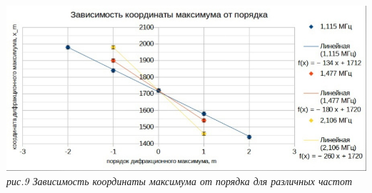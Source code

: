 \documentclass[a4paper]{article}
\begin{document}
\begin{center}
\includegraphics[width=14cm]{g1}\\
\textit{рис.9 Зависимость координаты максимума от порядка для различных частот}\\
\end{center}
\end{document}
